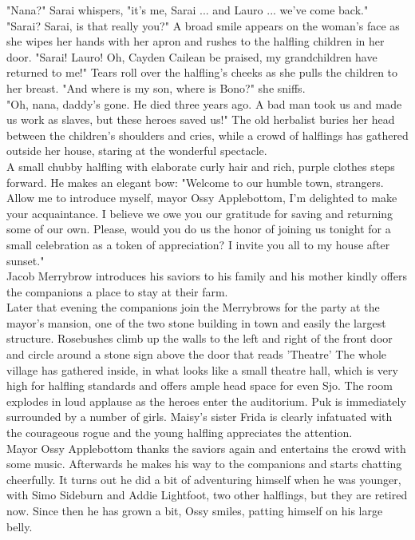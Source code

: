 "Nana?" Sarai whispers, "it's me, Sarai ... and Lauro ... we've come back."\\

"Sarai? Sarai, is that really you?" A broad smile appears on the woman's face as she wipes her hands with her apron and rushes to the halfling children in her door. "Sarai! Lauro! Oh, Cayden Cailean be praised, my grandchildren have returned to me!" Tears roll over the halfling's cheeks as she pulls the children to her breast. "And where is my son, where is Bono?" she sniffs.\\

"Oh, nana, daddy's gone. He died three years ago. A bad man took us and made us work as slaves, but these heroes saved us!" The old herbalist buries her head between the children's shoulders and cries, while a crowd of halflings has gathered outside her house, staring at the wonderful spectacle.\\

A small chubby halfling with elaborate curly hair and rich, purple clothes steps forward. He makes an elegant bow: "Welcome to our humble town, strangers. Allow me to introduce myself, mayor Ossy Applebottom, I'm delighted to make your acquaintance. I believe we owe you our gratitude for saving and returning some of our own. Please, would you do us the honor of joining us tonight for a small celebration as a token of appreciation? I invite you all to my house after sunset."\\

Jacob Merrybrow introduces his saviors to his family and his mother kindly offers the companions a place to stay at their farm.\\

Later that evening the companions join the Merrybrows for the party at the mayor's mansion, one of the two stone building in town and easily the largest structure. Rosebushes climb up the walls to the left and right of the front door and circle around a stone sign above the door that reads 'Theatre' The whole village has gathered inside, in what looks like a small theatre hall, which is very high for halfling standards and offers ample head space for even Sjo. The room explodes in loud applause as the heroes enter the auditorium. Puk is immediately surrounded by a number of girls. Maisy's sister Frida is clearly infatuated with the courageous rogue and the young halfling appreciates the attention.\\

Mayor Ossy Applebottom thanks the saviors again and entertains the crowd with some music. Afterwards he makes his way to the companions and starts chatting cheerfully. It turns out he did a bit of adventuring himself when he was younger, with Simo Sideburn and Addie Lightfoot, two other halflings, but they are retired now. Since then he has grown a bit, Ossy smiles, patting himself on his large belly.\\

